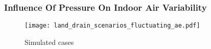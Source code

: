 \documentclass[journal=esthag,manuscript=article]{achemso}
\begin{document}


\subsubsection{Influence Of Pressure On Indoor Air Variability}


\begin{figure}[!h] %
	\centering
  \caption{Simulated cases}
  \label{fig:land_drain_scenarios_fluctuating_ae}
  \texttt{[image: land\_drain\_scenarios\_fluctuating\_ae.pdf]}
\end{figure}
\end{document}
